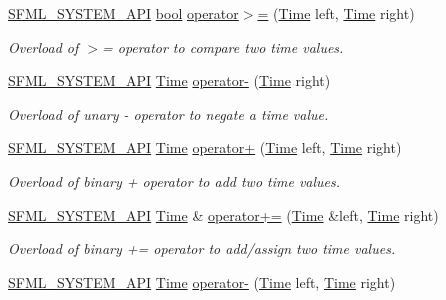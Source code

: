 \begin{DoxyCompactItemize}
\hyperlink{sfml_2dep_2_s_f_m_l-2_84_82_2include_2_s_f_m_l_2_system_2_export_8hpp_a6476c9e422606477a4c23d92b1d79a1f}{S\-F\-M\-L\-\_\-\-S\-Y\-S\-T\-E\-M\-\_\-\-A\-P\-I} \hyperlink{term__entry_8h_a002004ba5d663f149f6c38064926abac}{bool} \hyperlink{classsf_1_1_time_ad69edc80cd01b7a03f5673b4276181eb}{operator$>$=} (\hyperlink{classsf_1_1_time}{Time} left, \hyperlink{classsf_1_1_time}{Time} right)
\begin{DoxyCompactList}\small\item\em Overload of $>$= operator to compare two time values. \end{DoxyCompactList}\item 
\hyperlink{sfml_2dep_2_s_f_m_l-2_84_82_2include_2_s_f_m_l_2_system_2_export_8hpp_a6476c9e422606477a4c23d92b1d79a1f}{S\-F\-M\-L\-\_\-\-S\-Y\-S\-T\-E\-M\-\_\-\-A\-P\-I} \hyperlink{classsf_1_1_time}{Time} \hyperlink{classsf_1_1_time_a1b23b91cf367764338c2ff922c65da4e}{operator-\/} (\hyperlink{classsf_1_1_time}{Time} right)
\begin{DoxyCompactList}\small\item\em Overload of unary -\/ operator to negate a time value. \end{DoxyCompactList}\item 
\hyperlink{sfml_2dep_2_s_f_m_l-2_84_82_2include_2_s_f_m_l_2_system_2_export_8hpp_a6476c9e422606477a4c23d92b1d79a1f}{S\-F\-M\-L\-\_\-\-S\-Y\-S\-T\-E\-M\-\_\-\-A\-P\-I} \hyperlink{classsf_1_1_time}{Time} \hyperlink{classsf_1_1_time_a7155e965f238f8c32d63649b0189ef47}{operator+} (\hyperlink{classsf_1_1_time}{Time} left, \hyperlink{classsf_1_1_time}{Time} right)
\begin{DoxyCompactList}\small\item\em Overload of binary + operator to add two time values. \end{DoxyCompactList}\item 
\hyperlink{sfml_2dep_2_s_f_m_l-2_84_82_2include_2_s_f_m_l_2_system_2_export_8hpp_a6476c9e422606477a4c23d92b1d79a1f}{S\-F\-M\-L\-\_\-\-S\-Y\-S\-T\-E\-M\-\_\-\-A\-P\-I} \hyperlink{classsf_1_1_time}{Time} \& \hyperlink{classsf_1_1_time_a831c8df4b7b9b47eaa0c5a52a1be654c}{operator+=} (\hyperlink{classsf_1_1_time}{Time} \&left, \hyperlink{classsf_1_1_time}{Time} right)
\begin{DoxyCompactList}\small\item\em Overload of binary += operator to add/assign two time values. \end{DoxyCompactList}\item 
\hyperlink{sfml_2dep_2_s_f_m_l-2_84_82_2include_2_s_f_m_l_2_system_2_export_8hpp_a6476c9e422606477a4c23d92b1d79a1f}{S\-F\-M\-L\-\_\-\-S\-Y\-S\-T\-E\-M\-\_\-\-A\-P\-I} \hyperlink{classsf_1_1_time}{Time} \hyperlink{classsf_1_1_time_ace92ab9bc7aec80239af7218cd89cc80}{operator-\/} (\hyperlink{classsf_1_1_time}{Time} left, \hyperlink{classsf_1_1_time}{Time} right)

\end{DoxyCompactItemize}
